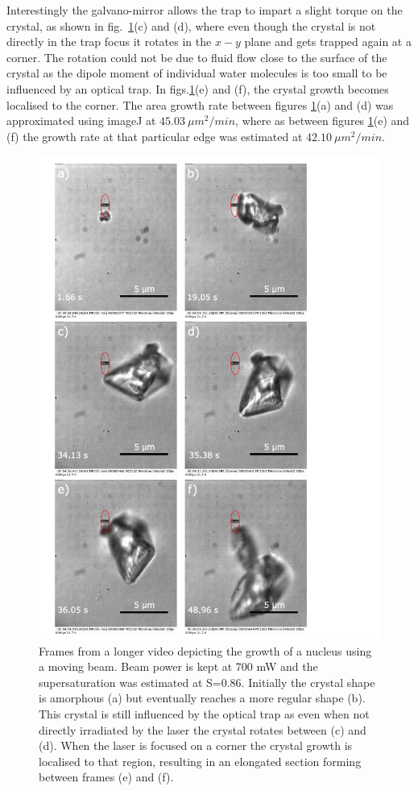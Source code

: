 Interestingly the galvano-mirror allows the trap to impart a slight torque 
on the crystal, as shown in fig.~\ref{fig:eliptical_beam_1}(c) and (d), 
where even though the crystal is not directly in the trap focus it rotates 
in the $x-y$ plane and gets trapped again at a corner. The rotation could 
not be due to fluid flow close to the surface of the crystal as the dipole 
moment of individual water molecules is too small to be influenced by an 
optical trap. In figs.\ref{fig:eliptical_beam_1}(e) and (f), the crystal 
growth becomes localised to the corner. The area growth rate between figures \ref{fig:eliptical_beam_1}(a) and (d) was approximated using imageJ at $45.03\ 
\mu m^2 /min$, where as between figures \ref{fig:eliptical_beam_1}(e) and 
(f) the growth rate at that particular edge was estimated at $42.10\ \mu m^2/min$. 
\begin{figure}[h!]
	\centering
	\includegraphics[width=0.85\linewidth]{frames_eliptical_beam.pdf}
	\caption{Frames from a longer video depicting the growth 
		of a nucleus using a moving beam. Beam power is kept 
		at 700 mW and the supersaturation was estimated at 
		S=0.86. Initially the crystal shape is amorphous (a) 
		but eventually reaches a more regular shape (b). This crystal is still influenced by the optical trap as 
		even when not directly irradiated by the laser the 
		crystal rotates between (c) and (d). When the laser 
		is focused on a corner the crystal growth is localised 
		to that region, resulting in an elongated section 
		forming between frames (e) and (f).}
	\label{fig:eliptical_beam_1}
\end{figure}
 
